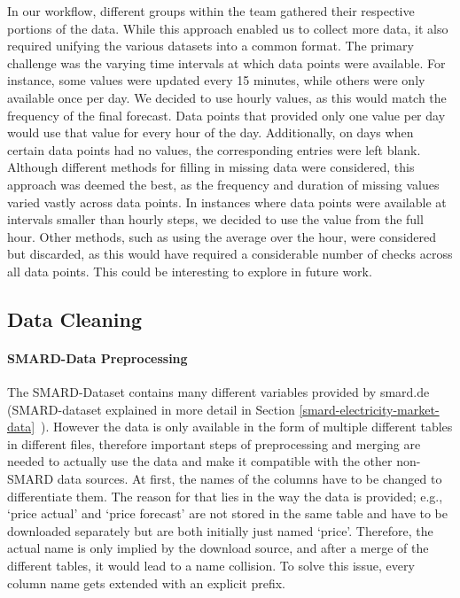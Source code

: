 \documentclass[a4paper]{article}
\begin{document}
In our workflow, different groups within the team gathered their
respective portions of the data. While this approach enabled us to
collect more data, it also required unifying the various datasets into a
common format. The primary challenge was the varying time intervals at
which data points were available. For instance, some values were updated
every 15 minutes, while others were only available once per day. We
decided to use hourly values, as this would match the frequency of the
final forecast. Data points that provided only one value per day would
use that value for every hour of the day. Additionally, on days when
certain data points had no values, the corresponding entries were left
blank. Although different methods for filling in missing data were
considered, this approach was deemed the best, as the frequency and
duration of missing values varied vastly across data points. In
instances where data points were available at intervals smaller than
hourly steps, we decided to use the value from the full hour. Other
methods, such as using the average over the hour, were considered but
discarded, as this would have required a considerable number of checks
across all data points. This could be interesting to explore in future
work.

    \subsection{Data Cleaning}\label{data-cleaning}

    \paragraph{SMARD-Data Preprocessing}\label{smard-data-preprocessing}

The SMARD-Dataset contains many different variables provided by smard.de
(SMARD-dataset explained in more detail in Section \ref{smard-electricity-market-data}~). However the data is only available in the form of multiple
different tables in different files, therefore important steps of
preprocessing and merging are needed to actually use the data and make
it compatible with the other non-SMARD data sources. At first, the names
of the columns have to be changed to differentiate them. The reason for
that lies in the way the data is provided; e.g., `price actual' and
`price forecast' are not stored in the same table and have to be
downloaded separately but are both initially just named `price'.
Therefore, the actual name is only implied by the download source, and
after a merge of the different tables, it would lead to a name
collision. To solve this issue, every column name gets extended with an
explicit prefix.
\end{document}
